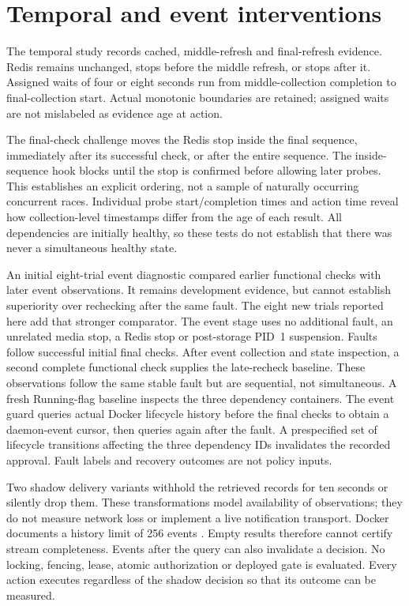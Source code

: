 \documentclass[11pt]{article}
\begin{document}
\section{Temporal and event interventions}
The temporal study records cached, middle-refresh and final-refresh evidence. Redis remains unchanged, stops before the middle refresh, or stops after it. Assigned waits of four or eight seconds run from middle-collection completion to final-collection start. Actual monotonic boundaries are retained; assigned waits are not mislabeled as evidence age at action.

The final-check challenge moves the Redis stop inside the final sequence, immediately after its successful check, or after the entire sequence. The inside-sequence hook blocks until the stop is confirmed before allowing later probes. This establishes an explicit ordering, not a sample of naturally occurring concurrent races. Individual probe start/completion times and action time reveal how collection-level timestamps differ from the age of each result. All dependencies are initially healthy, so these tests do not establish that there was never a simultaneous healthy state.

An initial eight-trial event diagnostic compared earlier functional checks with later event observations. It remains development evidence, but cannot establish superiority over rechecking after the same fault. The eight new trials reported here add that stronger comparator. The event stage uses no additional fault, an unrelated media stop, a Redis stop or post-storage PID~1 suspension. Faults follow successful initial final checks. After event collection and state inspection, a second complete functional check supplies the late-recheck baseline. These observations follow the same stable fault but are sequential, not simultaneous. A fresh Running-flag baseline inspects the three dependency containers. The event guard queries actual Docker lifecycle history before the final checks to obtain a daemon-event cursor, then queries again after the fault. A prespecified set of lifecycle transitions affecting the three dependency IDs invalidates the recorded approval. Fault labels and recovery outcomes are not policy inputs.

Two shadow delivery variants withhold the retrieved records for ten seconds or silently drop them. These transformations model availability of observations; they do not measure network loss or implement a live notification transport. Docker documents a history limit of 256 events \cite{docker}. Empty results therefore cannot certify stream completeness. Events after the query can also invalidate a decision. No locking, fencing, lease, atomic authorization or deployed gate is evaluated. Every action executes regardless of the shadow decision so that its outcome can be measured.
\end{document}
